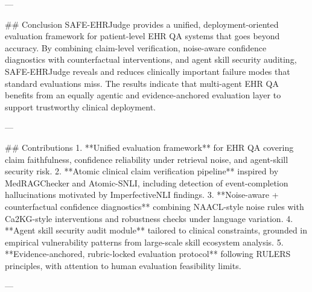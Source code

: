 ---

## Conclusion  
SAFE-EHRJudge provides a unified, deployment-oriented evaluation framework for patient-level EHR QA systems that goes beyond accuracy. By combining claim-level verification, noise-aware confidence diagnostics with counterfactual interventions, and agent skill security auditing, SAFE-EHRJudge reveals and reduces clinically important failure modes that standard evaluations miss. The results indicate that multi-agent EHR QA benefits from an equally agentic and evidence-anchored evaluation layer to support trustworthy clinical deployment.

---

## Contributions  
1. **Unified evaluation framework** for EHR QA covering claim faithfulness, confidence reliability under retrieval noise, and agent-skill security risk.  
2. **Atomic clinical claim verification pipeline** inspired by MedRAGChecker and Atomic-SNLI, including detection of event-completion hallucinations motivated by ImperfectiveNLI findings.  
3. **Noise-aware + counterfactual confidence diagnostics** combining NAACL-style noise rules with Ca2KG-style interventions and robustness checks under language variation.  
4. **Agent skill security audit module** tailored to clinical constraints, grounded in empirical vulnerability patterns from large-scale skill ecosystem analysis.  
5. **Evidence-anchored, rubric-locked evaluation protocol** following RULERS principles, with attention to human evaluation feasibility limits.

---